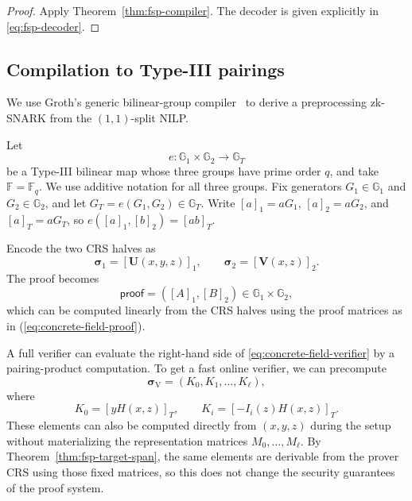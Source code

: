 \documentclass[11pt]{article}
\theoremstyle{definition}
\newcommand{\F}{\mathbb F}
\newcommand{\Gone}{\mathbb G_1}
\newcommand{\Gtwo}{\mathbb G_2}
\newcommand{\GT}{\mathbb G_T}
\newcommand{\ProofObj}{\mathsf{proof}}
\begin{document}
\begin{proof}
Apply Theorem~\ref{thm:fsp-compiler}.  The decoder is given explicitly in
\eqref{eq:fsp-decoder}.
\end{proof}

\subsection{Compilation to Type-III pairings}

We use Groth's generic bilinear-group compiler~\cite[Section~2.5]{Groth16} to derive a preprocessing zk-SNARK from the $(1,1)$-split NILP.

Let
\[
  e:\Gone\times\Gtwo\longrightarrow\GT
\]
be a Type-III bilinear map whose three groups have prime order $q$, and take
$\F=\F_q$.  We use additive notation for all three groups.  Fix generators
$G_1\in\Gone$ and $G_2\in\Gtwo$, and let $G_T=e(G_1,G_2)\in\GT$.  Write
$[a]_1=aG_1$, $[a]_2=aG_2$, and $[a]_T=aG_T$, so
$e([a]_1,[b]_2)=[ab]_T$.

Encode the two CRS halves as
\begin{equation}
  \boldsymbol{\sigma}_1=[\mathbf U(x,y,z)]_1,
  \qquad
  \boldsymbol{\sigma}_2=[\mathbf V(x,z)]_2.
  \label{eq:pairing-prover-crs}
\end{equation}
The proof becomes 
\begin{equation}
  \ProofObj=([A]_1,[B]_2)\in\Gone\times\Gtwo,
  \label{eq:pairing-proof}
\end{equation}
which can be computed linearly from the CRS halves using the proof matrices as in (\ref{eq:concrete-field-proof}).

A full verifier can evaluate the right-hand side of
\eqref{eq:concrete-field-verifier} by a pairing-product computation.
To get a fast online verifier, we can precompute 
\begin{equation}
  \boldsymbol{\sigma}_{\mathrm V}=(K_0,K_1,\ldots,K_\ell),
  \label{eq:short-vk}
\end{equation}
where
\begin{equation}
  K_0=[yH(x,z)]_T,
  \qquad
  K_i=[-I_i(z)H(x,z)]_T.
  \label{eq:short-vk-elements}
\end{equation}
These elements can also be computed directly from $(x,y,z)$ during the setup without materializing the representation matrices $M_0,\ldots,M_\ell$.  By
Theorem~\ref{thm:fsp-target-span}, the same elements are derivable from
the prover CRS using those fixed matrices, so this does not change the security guarantees of the proof system.
\end{document}
